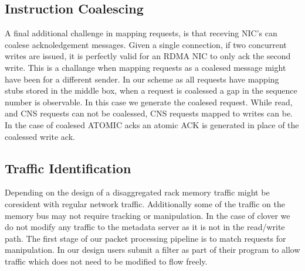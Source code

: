 \subsection{Instruction Coalescing} A final additional challenge in mapping
requests, is that receving NIC's can coalese acknoledgement messages. Given a
single connection, if two concurrent writes are issued, it is perfectly valid
for an RDMA NIC to only ack the second write. This is a challange when mapping
requests as a coalesed message might have been for a different sender. In our
scheme as all requests have mapping stubs stored in the middle box, when a
request is coalessed a gap in the sequence number is observable. In this case we
generate the coalesed request. While read, and CNS requests can not be
coalessed, CNS requests mapped to writes can be. In the case of coalesed ATOMIC
acks an atomic ACK is generated in place of the coalessed write ack.


\subsection{Traffic Identification} Depending on the design of a disaggregated
rack memory traffic might be coresident with regular network traffic.
Additionally some of the traffic on the memory bus may not require tracking or
manipulation. In the case of clover we do not modify any traffic to the metadata
server as it is not in the read/write path. The first stage of our packet
processing pipeline is to match requests for manipulation. In our design users
submit a filter as part of their program to allow traffic which does not need to
be modified to flow freely.

